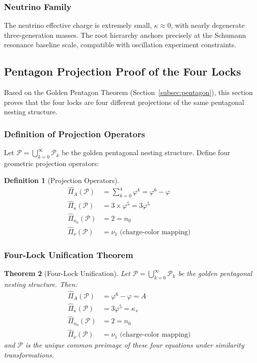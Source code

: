\documentclass[12pt,a4paper,twocolumn]{article}
\renewcommand{\phi}{\varphi}
\newtheorem{theorem}{Theorem}[section]
\newtheorem{definition}[theorem]{Definition}
\begin{document}
\subsubsection{Neutrino Family}
The neutrino effective charge is extremely small, $\kappa \approx 0$, with nearly degenerate three-generation masses. The root hierarchy anchors precisely at the Schumann resonance baseline scale, compatible with oscillation experiment constraints.

\subsection{Pentagon Projection Proof of the Four Locks}
\label{subsec:four_locks_pentagon}

Based on the Golden Pentagon Theorem (Section~\ref{subsec:pentagon}), this section proves that the four locks are four different projections of the same pentagonal nesting structure.

\subsubsection{Definition of Projection Operators}

Let $\mathcal{P} = \bigcup_{k=0}^\infty \mathcal{P}_k$ be the golden pentagonal nesting structure. Define four geometric projection operators:

\begin{definition}[Projection Operators]
\begin{align}
\hat{\Pi}_A(\mathcal{P}) &= \sum_{k=0}^{4} \phi^k = \phi^6 - \phi \\
\hat{\Pi}_\kappa(\mathcal{P}) &= 3 \times \phi^5 = 3\phi^5 \\
\hat{\Pi}_{n_0}(\mathcal{P}) &= 2 = n_0 \\
\hat{\Pi}_\nu(\mathcal{P}) &= \nu_1 \text{ (charge-color mapping)}
\end{align}
\end{definition}

\subsubsection{Four-Lock Unification Theorem}

\begin{theorem}[Four-Lock Unification]
Let $\mathcal{P} = \bigcup_{k=0}^\infty \mathcal{P}_k$ be the golden pentagonal nesting structure. Then:
\begin{align}
\hat{\Pi}_A(\mathcal{P}) &= \phi^6 - \phi = A \\
\hat{\Pi}_\kappa(\mathcal{P}) &= 3\phi^5 = \kappa_s \\
\hat{\Pi}_{n_0}(\mathcal{P}) &= 2 = n_0 \\
\hat{\Pi}_\nu(\mathcal{P}) &= \nu_1 \text{ (charge-color mapping)}
\end{align}
and $\mathcal{P}$ is the unique common preimage of these four equations under similarity transformations.
\end{theorem}
\end{document}
